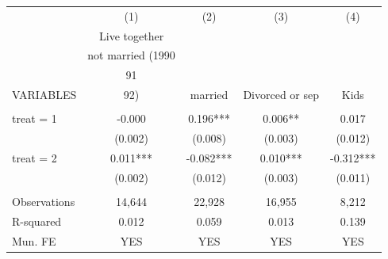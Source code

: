 \begin{tabular}{lcccc} \hline
 & (1) & (2) & (3) & (4) \\
 & Live together &  &  &  \\
 & not married (1990 &  &  &  \\
 & 91 &  &  &  \\
VARIABLES & 92) & married & Divorced or sep & Kids \\ \hline
 &  &  &  &  \\
treat = 1 & -0.000 & 0.196*** & 0.006** & 0.017 \\
 & (0.002) & (0.008) & (0.003) & (0.012) \\
treat = 2 & 0.011*** & -0.082*** & 0.010*** & -0.312*** \\
 & (0.002) & (0.012) & (0.003) & (0.011) \\
 &  &  &  &  \\
Observations & 14,644 & 22,928 & 16,955 & 8,212 \\
R-squared & 0.012 & 0.059 & 0.013 & 0.139 \\
 Mun. FE & YES & YES & YES & YES \\ \hline
\end{tabular}
